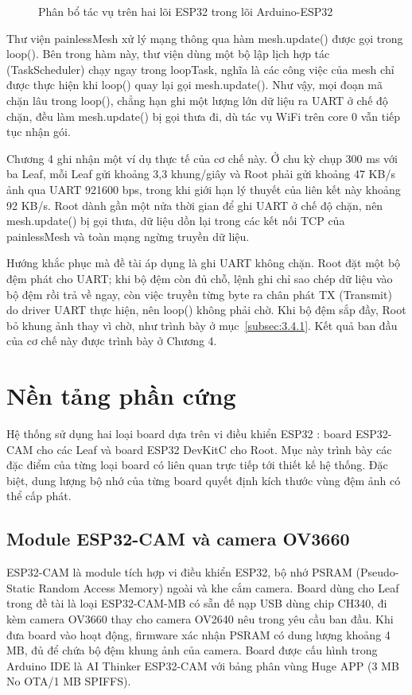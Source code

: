 \begin{figure}[!htbp]
\centering

\caption{Phân bổ tác vụ trên hai lõi ESP32 trong lõi Arduino-ESP32}\label{fig:2.1}
\end{figure}


Thư viện painlessMesh xử lý mạng thông qua hàm mesh.update() được gọi trong loop(). Bên trong hàm này, thư viện dùng một bộ lập lịch hợp tác (TaskScheduler) chạy ngay trong loopTask, nghĩa là các công việc của mesh chỉ được thực hiện khi loop() quay lại gọi mesh.update(). Như vậy, mọi đoạn mã chặn lâu trong loop(), chẳng hạn ghi một lượng lớn dữ liệu ra UART ở chế độ chặn, đều làm mesh.update() bị gọi thưa đi, dù tác vụ WiFi trên core 0 vẫn tiếp tục nhận gói.

Chương 4 ghi nhận một ví dụ thực tế của cơ chế này. Ở chu kỳ chụp 300 ms với ba Leaf, mỗi Leaf gửi khoảng 3,3 khung/giây và Root phải gửi khoảng 47 KB/s ảnh qua UART 921600 bps, trong khi giới hạn lý thuyết của liên kết này khoảng 92 KB/s. Root dành gần một nửa thời gian để ghi UART ở chế độ chặn, nên mesh.update() bị gọi thưa, dữ liệu dồn lại trong các kết nối TCP của painlessMesh và toàn mạng ngừng truyền dữ liệu.

Hướng khắc phục mà đề tài áp dụng là ghi UART không chặn. Root đặt một bộ đệm phát cho UART; khi bộ đệm còn đủ chỗ, lệnh ghi chỉ sao chép dữ liệu vào bộ đệm rồi trả về ngay, còn việc truyền từng byte ra chân phát TX (Transmit) do driver UART thực hiện, nên loop() không phải chờ. Khi bộ đệm sắp đầy, Root bỏ khung ảnh thay vì chờ, như trình bày ở mục~\ref{subsec:3.4.1}. Kết quả ban đầu của cơ chế này được trình bày ở Chương 4.


\section{Nền tảng phần cứng}

Hệ thống sử dụng hai loại board dựa trên vi điều khiển ESP32 \citep{espressif_esp32_datasheet}: board ESP32-CAM cho các Leaf và board ESP32 DevKitC cho Root. Mục này trình bày các đặc điểm của từng loại board có liên quan trực tiếp tới thiết kế hệ thống. Đặc biệt, dung lượng bộ nhớ của từng board quyết định kích thước vùng đệm ảnh có thể cấp phát.


\subsection{Module ESP32-CAM và camera OV3660}

ESP32-CAM là module tích hợp vi điều khiển ESP32, bộ nhớ PSRAM (Pseudo-Static Random Access Memory) ngoài và khe cắm camera. Board dùng cho Leaf trong đề tài là loại ESP32-CAM-MB có sẵn đế nạp USB dùng chip CH340, đi kèm camera OV3660 thay cho camera OV2640 nêu trong yêu cầu ban đầu. Khi đưa board vào hoạt động, firmware xác nhận PSRAM có dung lượng khoảng 4 MB, đủ để chứa bộ đệm khung ảnh của camera. Board được cấu hình trong Arduino IDE là AI Thinker ESP32-CAM với bảng phân vùng Huge APP (3 MB No OTA/1 MB SPIFFS).


